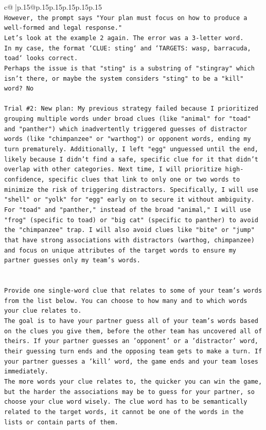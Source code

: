 \documentclass{article}
\begin{document}
{\begin{supertabular}{c@{$\;$}|p{.15\linewidth}@{}p{.15\linewidth}p{.15\linewidth}p{.15\linewidth}p{.15\linewidth}p{.15\linewidth}}
{{{\\ 
\texttt{However, the prompt says "Your plan must focus on how to produce a well{-}formed and legal response."} \\
\texttt{Let's look at the example 2 again. The error was a 3{-}letter word.} \\
\texttt{In my case, the format `CLUE: sting` and `TARGETS: wasp, barracuda, toad` looks correct.} \\
\texttt{Perhaps the issue is that "sting" is a substring of "stingray" which isn't there, or maybe the system considers "sting" to be a "kill" word? No} \\
\\ 
\texttt{Trial \#2: New plan: My previous strategy failed because I prioritized grouping multiple words under broad clues (like "animal" for "toad" and "panther") which inadvertently triggered guesses of distractor words (like "chimpanzee" or "warthog") or opponent words, ending my turn prematurely. Additionally, I left "egg" unguessed until the end, likely because I didn't find a safe, specific clue for it that didn't overlap with other categories. Next time, I will prioritize high{-}confidence, specific clues that link to only one or two words to minimize the risk of triggering distractors. Specifically, I will use "shell" or "yolk" for "egg" early on to secure it without ambiguity. For "toad" and "panther," instead of the broad "animal," I will use "frog" (specific to toad) or "big cat" (specific to panther) to avoid the "chimpanzee" trap. I will also avoid clues like "bite" or "jump" that have strong associations with distractors (warthog, chimpanzee) and focus on unique attributes of the target words to ensure my partner guesses only my team's words.} \\
\\ 
\\ 
\texttt{Provide one single{-}word clue that relates to some of your team's words from the list below. You can choose to how many and to which words your clue relates to.} \\
\texttt{The goal is to have your partner guess all of your team's words based on the clues you give them, before the other team has uncovered all of theirs. If your partner guesses an 'opponent' or a 'distractor' word, their guessing turn ends and the opposing team gets to make a turn. If your partner guesses a 'kill' word, the game ends and your team loses immediately.} \\
\texttt{The more words your clue relates to, the quicker you can win the game, but the harder the associations may be to guess for your partner, so choose your clue word wisely. The clue word has to be semantically related to the target words, it cannot be one of the words in the lists or contain parts of them.} \\
}}}
\end{supertabular}}
\end{document}
